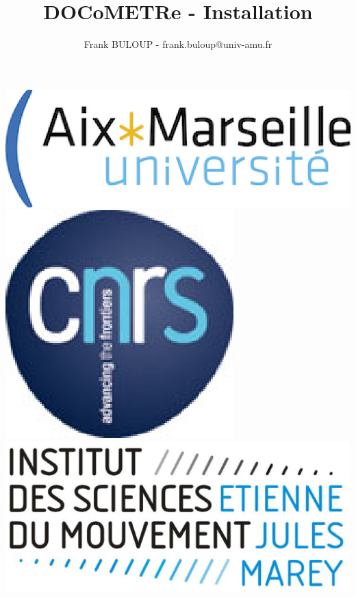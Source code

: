 \documentclass[a4paper,11pt]{beamer}
\title{DOCoMETRe - Installation}
\author{Frank BULOUP - frank.buloup@univ-amu.fr}
\institute{Aix Marseille Université\\Institut des Sciences du Mouvement}
\date{}
\begin{document}
 

\begin{frame}[plain]
	\titlepage
	\vspace{1cm}
 
	\includegraphics[scale=0.3]{images/LogoAMU.eps}\hspace*{2cm}
	\includegraphics[scale=0.2]{images/LogoCNRS.eps}\hspace*{2cm}
	\includegraphics[scale=0.1]{images/LogoISM.eps}
\end{frame}
\end{document}
